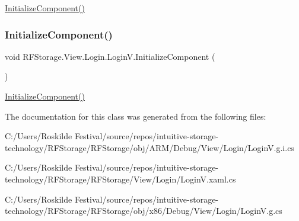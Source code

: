 \mbox{\hyperlink{class_r_f_storage_1_1_view_1_1_login_1_1_login_v_a538dafe420b2a8cba6fdf609380af5e8}{Initialize\+Component()}} 

\mbox{\label{class_r_f_storage_1_1_view_1_1_login_1_1_login_v_a538dafe420b2a8cba6fdf609380af5e8}} 
\subsubsection{\texorpdfstring{InitializeComponent()}{InitializeComponent()}\hspace{0.1cm}{\footnotesize\ttfamily [8/8]}}
{\footnotesize\ttfamily void R\+F\+Storage.\+View.\+Login.\+Login\+V.\+Initialize\+Component (\begin{DoxyParamCaption}{ }\end{DoxyParamCaption})}



\mbox{\hyperlink{class_r_f_storage_1_1_view_1_1_login_1_1_login_v_a538dafe420b2a8cba6fdf609380af5e8}{Initialize\+Component()}} 



The documentation for this class was generated from the following files\+:\begin{DoxyCompactItemize}
\item 
C\+:/\+Users/\+Roskilde Festival/source/repos/intuitive-\/storage-\/technology/\+R\+F\+Storage/\+R\+F\+Storage/obj/\+A\+R\+M/\+Debug/\+View/\+Login/Login\+V.\+g.\+i.\+cs\item 
C\+:/\+Users/\+Roskilde Festival/source/repos/intuitive-\/storage-\/technology/\+R\+F\+Storage/\+R\+F\+Storage/\+View/\+Login/Login\+V.\+xaml.\+cs\item 
C\+:/\+Users/\+Roskilde Festival/source/repos/intuitive-\/storage-\/technology/\+R\+F\+Storage/\+R\+F\+Storage/obj/x86/\+Debug/\+View/\+Login/Login\+V.\+g.\+cs\end{DoxyCompactItemize}
